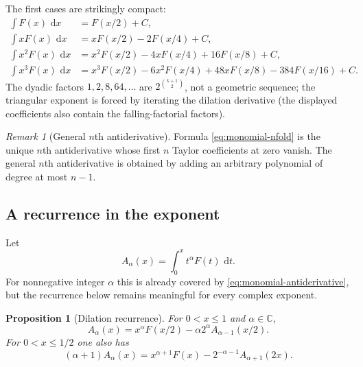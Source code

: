 \documentclass[11pt,oneside]{article}
\numberwithin{equation}{section}
\newtheorem{proposition}[theorem]{Proposition}
\theoremstyle{definition}
\theoremstyle{remark}
\newtheorem{remark}[theorem]{Remark}
\newcommand{\C}{\mathbb C}
\newcommand{\dd}{\,\mathrm d}
\begin{document}
The first cases are strikingly compact:
\begin{align}
 \int F(x)\,\dd x
 &=F(x/2)+C,                                                   \label{eq:example-p0}\\
 \int xF(x)\,\dd x
 &=xF(x/2)-2F(x/4)+C,                                         \label{eq:example-p1}\\
 \int x^2F(x)\,\dd x
 &=x^2F(x/2)-4xF(x/4)+16F(x/8)+C,                             \label{eq:example-p2}\\
 \int x^3F(x)\,\dd x
 &=x^3F(x/2)-6x^2F(x/4)+48xF(x/8)-384F(x/16)+C.               \label{eq:example-p3}
\end{align}
The dyadic factors $1,2,8,64,\ldots$ are $2^{\binom{k+1}{2}}$, not a geometric sequence;
the triangular exponent is forced by iterating the dilation derivative (the displayed
coefficients also contain the falling-factorial factors).

\begin{remark}[General $n$th antiderivative]
Formula \eqref{eq:monomial-nfold} is the unique $n$th antiderivative whose first $n$ Taylor
coefficients at zero vanish.  The general $n$th antiderivative is obtained by adding an
arbitrary polynomial of degree at most $n-1$.
\end{remark}

\subsection{A recurrence in the exponent}

Let
\begin{equation}
 A_\alpha(x)=\int_0^x t^\alpha F(t)\,\dd t.                   \label{eq:Aalpha}
\end{equation}
For nonnegative integer $\alpha$ this is already covered by
\eqref{eq:monomial-antiderivative}, but the recurrence below remains meaningful for every
complex exponent.

\begin{proposition}[Dilation recurrence]
\label{prop:A-recurrence}
For $0<x\le1$ and $\alpha\in\C$,
\begin{equation}
 A_\alpha(x)=x^\alpha F(x/2)-\alpha2^\alpha A_{\alpha-1}(x/2).
 \label{eq:A-recurrence}
\end{equation}
For $0<x\le1/2$ one also has
\begin{equation}
 (\alpha+1)A_\alpha(x)
 =x^{\alpha+1}F(x)-2^{-\alpha-1}A_{\alpha+1}(2x).
 \label{eq:A-functional-recurrence}
\end{equation}
\end{proposition}
\end{document}
